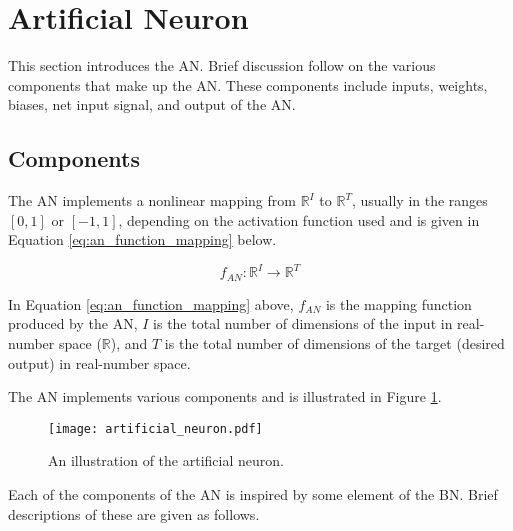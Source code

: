 \section{Artificial Neuron}\label{sec:anns:an}

This section introduces the \ac{AN}. Brief discussion follow on the various components that make up the \ac{AN}. These components include inputs, weights, biases, net input signal, and output of the \ac{AN}.

\subsection{Components}\label{sec:anns:components}

The \ac{AN} implements a nonlinear mapping from $\mathbb{R}^{I}$ to
$\mathbb{R}^{T}$, usually in the ranges $[0,1]$ or $[-1,1]$, depending on the
activation function used \cite{ref:engelbrecht:2007} and is given
in Equation \eqref{eq:an_function_mapping} below.

\begin{equation}
    f_{AN} \colon \mathbb{R}^{I} \to \mathbb{R}^{T}
    \label{eq:an_function_mapping}
\end{equation}

\noindent
In Equation \eqref{eq:an_function_mapping} above, $f_{AN}$ is the mapping function produced by the \ac{AN}, $I$ is the total number of dimensions of the input in real-number space ($\mathbb{R}$), and $T$ is the total number of dimensions of the target (desired output) in real-number space.

The \ac{AN} implements various components and is illustrated in Figure \ref{fig:artificial_neuron}.

\begin{figure}[htpb]
    \centering
    \texttt{[image: artificial\_neuron.pdf]}
    \caption[The artificial neuron]{An illustration of the artificial neuron.}
    \label{fig:artificial_neuron}
\end{figure}

\noindent
Each of the components of the \ac{AN} is inspired by some element of the \ac{BN}. Brief descriptions of these are given as follows.

